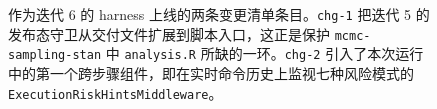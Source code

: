 \begin{figure}[t]
\begin{tcbraster}
\begin{tcolorbox}[colback=aheTeal!12,colframe=aheBlue,colbacktitle=aheBlue,
                          title={\scriptsize\textbf{chg-2，迭代 6，commit \texttt{9651986}，层级：中间件}}]
        \end{tcolorbox}
    \end{tcbraster}
    \caption{作为迭代 6 的 harness 上线的两条变更清单条目。\texttt{chg-1} 把迭代 5 的发布态守卫从交付文件扩展到脚本入口，这正是保护 \texttt{mcmc-sampling-stan} 中 \texttt{analysis.R} 所缺的一环。\texttt{chg-2} 引入了本次运行中的第一个跨步骤组件，即在实时命令历史上监视七种风险模式的 \texttt{ExecutionRiskHintsMiddleware}。}
    \label{fig:manifest-middleware}
\end{figure}
